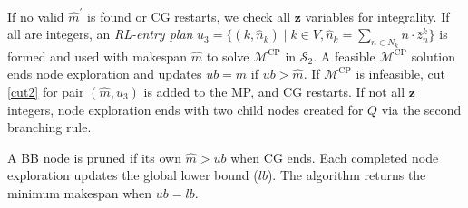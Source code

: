 \documentclass[12pt]{article}
\begin{document}
If no valid $\widehat{m}^{\prime}$ is found or CG restarts, we check all $\boldsymbol{z}$ variables for integrality. If all are integers, an \textit{RL-entry plan} $u_3=\{(k,\widehat{n}_k)\mid k\in V, \widehat{n}_k=\sum_{n\in N_k}{n\cdot \bar{z}^k_n}\}$ is formed and used with makespan $\widehat{m}$ to solve $\mathcal{M}^{\text{CP}}$ in $\mathcal{S}_2$. A feasible $\mathcal{M}^{\text{CP}}$ solution ends node exploration and updates $ub=\widehat{m}$ if $ub>\widehat{m}$.
If $\mathcal{M}^{\text{CP}}$ is infeasible, cut \eqref{cut2} for pair $(\widehat{m},u_3)$ is added to the MP, and CG restarts. If not all $\boldsymbol{z}$ integers, node exploration ends with two child nodes created for $Q$ via the second branching rule.




A BB node is pruned if its own $\widehat{m}>ub$ when CG ends. Each completed node exploration updates the global lower bound ($lb$). The algorithm returns the minimum makespan when $ub = lb$.

\end{document}
